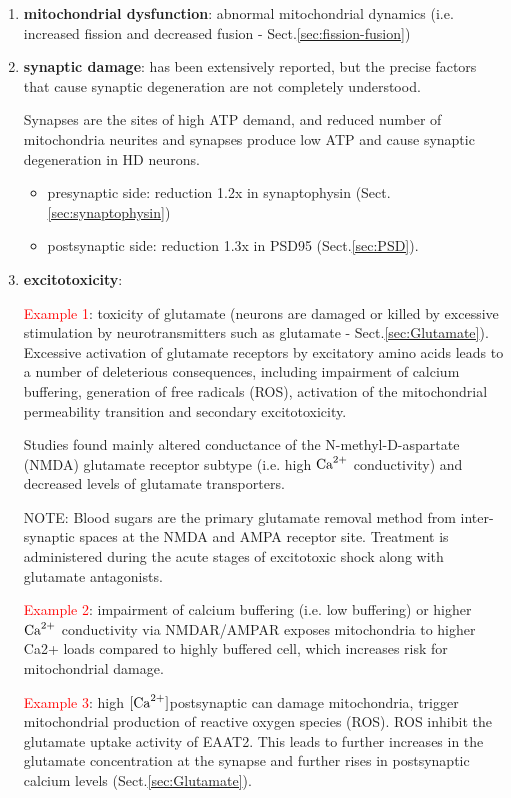 \begin{enumerate}
  \item {\bf mitochondrial dysfunction}: abnormal mitochondrial dynamics (i.e. increased fission and decreased fusion - Sect.\ref{sec:fission-fusion})

  \item {\bf synaptic damage}:
  has been extensively reported, but the  precise factors that cause synaptic
  degeneration are not completely understood.

  Synapses are the sites of high ATP demand, and reduced number of mitochondria
  neurites and synapses produce low ATP and cause synaptic degeneration in HD
  neurons.
  \begin{itemize}
    \item presynaptic side: reduction 1.2x in synaptophysin
    (Sect.\ref{sec:synaptophysin})
    
    \item postsynaptic side: reduction 1.3x in PSD95 (Sect.\ref{sec:PSD}).
    
  \end{itemize}
  
  \item {\bf excitotoxicity}: 
  
  \textcolor{red}{Example 1}: toxicity of glutamate (neurons are damaged or
  killed by excessive stimulation by neurotransmitters such as glutamate -
  Sect.\ref{sec:Glutamate}).
  Excessive activation of glutamate receptors by excitatory amino acids leads to
  a number of deleterious consequences, including impairment of calcium
  buffering, generation of free radicals (ROS), activation of the mitochondrial
  permeability transition and secondary excitotoxicity.
  
  
  Studies found  mainly altered conductance of the N-methyl-D-aspartate (NMDA)
  glutamate receptor subtype (i.e. high ${\text{Ca}^{2+}}$ conductivity) and decreased levels
  of glutamate transporters.
  
  NOTE: Blood sugars are the primary glutamate removal method from
  inter-synaptic spaces at the NMDA and AMPA receptor site. Treatment is
  administered during the acute stages of excitotoxic shock along with glutamate antagonists.
  
  \textcolor{red}{Example 2}: impairment of calcium buffering (i.e. low
  buffering) or higher ${\text{Ca}^{2+}}$ conductivity via NMDAR/AMPAR exposes mitochondria
  to higher Ca2+ loads compared to highly buffered cell, which increases risk
  for mitochondrial damage.
  
  \textcolor{red}{Example 3}: high $[{\text{Ca}^{2+}}]$postsynaptic can damage mitochondria,
  trigger mitochondrial production of reactive oxygen species (ROS). ROS inhibit
  the glutamate uptake activity of EAAT2. This leads to further increases in the
  glutamate concentration at the synapse and further rises in postsynaptic
  calcium levels (Sect.\ref{sec:Glutamate}).


\end{enumerate}
